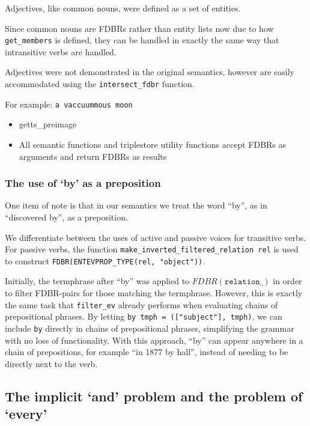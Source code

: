 \documentclass[../main.tex]{subfiles}
\begin{document}
Adjectives, like common nouns, were defined as a set of entities.

Since common nouns are FDBRs rather than entity lists now due to how \texttt{get\_members} is defined, they can be handled in exactly
the same way that intransitive verbs are handled.

Adjectives were not demonstrated in the original semantics, however are easily accommodated using the \texttt{intersect\_fdbr} function.

For example: \texttt{a vaccuummous moon}



\begin{itemize}
	\item getts\_preimage
	\item All semantic functions and triplestore utility functions accept FDBRs as arguments and return FDBRs as results
\end{itemize}

\subsubsection{The use of `by' as a preposition}

One item of note is that in our semantics we treat the word ``by'', as in ``discovered by'', as a preposition.

We differentiate between the uses of active and passive voices for transitive verbs.  For passive verbs, the function
\texttt{make\_inverted\_filtered\_relation rel} is used to construct \texttt{FDBR(ENTEVPROP\_TYPE(rel, "object"))}.

Initially, the termphrase after ``by'' was applied to $FDBR(\texttt{relation\_})$ in order to filter FDBR-pairs for those matching
the termphrase.  However, this is exactly the same task that \texttt{filter\_ev} already performs when evaluating chains of prepositional phrases.
By letting \texttt{by tmph = (["subject"], tmph)}, we can include \texttt{by} directly in chains of prepositional phrases, simplifying the grammar
with no loss of functionality.  With this approach, ``by'' can appear anywhere in a chain of prepositions, for example ``in 1877 by hall'', instead
of needing to be directly next to the verb.


\subsection{The implicit `and' problem and the problem of `every'}
\end{document}
